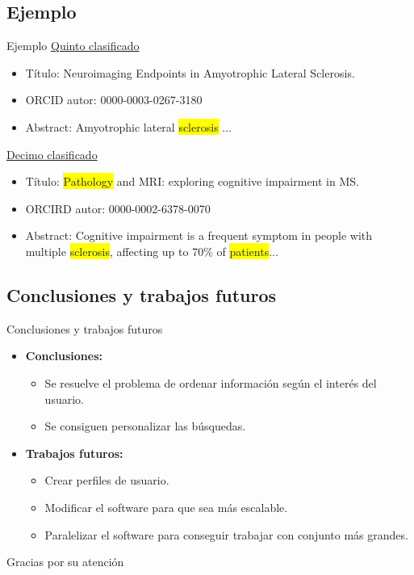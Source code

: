 \documentclass[ignorenonframetext,aspectratio=43,]{beamer}
\begin{document}
\subsection{Ejemplo}
\begin{frame}{Ejemplo}
\underline{Quinto clasificado}
\begin{itemize}
\item Título: Neuroimaging Endpoints in Amyotrophic Lateral Sclerosis.
\item ORCID autor: 0000-0003-0267-3180
\item Abstract: Amyotrophic lateral \colorbox{yellow}{sclerosis} ...
\end{itemize}

\underline{Decimo clasificado}
\begin{itemize}
\item Título: \colorbox{yellow}{Pathology} and MRI: exploring cognitive impairment in MS.
\item ORCIRD autor: 0000-0002-6378-0070
\item Abstract: Cognitive impairment is a frequent symptom in people with multiple \colorbox{yellow}{sclerosis}, affecting up to 70\% of \colorbox{yellow}{patients}...
\end{itemize}
\end{frame}

\subsection{Conclusiones y trabajos futuros}
\begin{frame}{Conclusiones y trabajos futuros}
\begin{itemize}
\item \textbf{Conclusiones:}
\begin{itemize}
\item Se resuelve el problema de ordenar información según el interés del usuario.
\item Se consiguen personalizar las búsquedas.
\end{itemize}
\item \textbf{Trabajos futuros:}
\begin{itemize}
\item Crear perfiles de usuario.
\item Modificar el software para que sea más escalable.
\item Paralelizar el software para conseguir trabajar con conjunto más grandes.
\end{itemize}
\end{itemize}
\end{frame}
\begin{frame}[standout]

Gracias por su atención
\end{frame}
\end{document}
